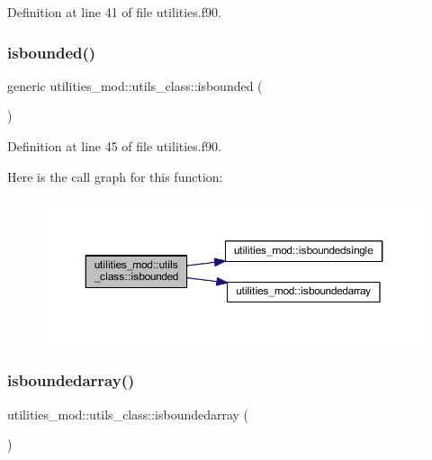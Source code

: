 Definition at line 41 of file utilities.\+f90.

\mbox{\label{structutilities__mod_1_1utils__class_acd0be828aa3a873c635cb9742ef06b13}} 
\subsubsection{\texorpdfstring{isbounded()}{isbounded()}}
{\footnotesize\ttfamily generic utilities\+\_\+mod\+::utils\+\_\+class\+::isbounded (\begin{DoxyParamCaption}{ }\end{DoxyParamCaption})\hspace{0.3cm}{\ttfamily [private]}}



Definition at line 45 of file utilities.\+f90.

Here is the call graph for this function\+:\nopagebreak
\begin{figure}[H]
\begin{center}
\leavevmode
\includegraphics[width=350pt]{structutilities__mod_1_1utils__class_acd0be828aa3a873c635cb9742ef06b13_cgraph}
\end{center}
\end{figure}
\mbox{\label{structutilities__mod_1_1utils__class_ae513529301733a624bcb1e984131edcd}} 
\subsubsection{\texorpdfstring{isboundedarray()}{isboundedarray()}}
{\footnotesize\ttfamily utilities\+\_\+mod\+::utils\+\_\+class\+::isboundedarray (\begin{DoxyParamCaption}{ }\end{DoxyParamCaption})\hspace{0.3cm}{\ttfamily [private]}}



